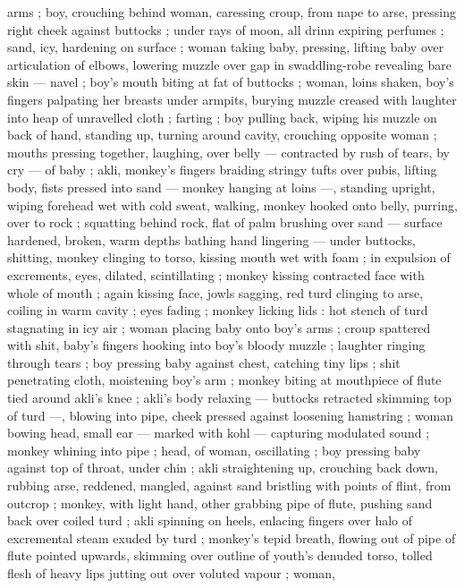 arms ; boy, crouching behind woman, caressing croup, from nape to 
arse, pressing right cheek against buttocks ; under rays of moon, all 
drinn expiring perfumes ; sand, icy, hardening on surface ; woman 
taking baby, pressing, lifting baby over articulation of elbows, 
lowering muzzle over gap in swaddling-robe revealing bare skin --- 
navel ; boy's mouth biting at fat of buttocks ; woman, loins shaken, 
boy's fingers palpating her breasts under armpits, burying muzzle 
creased with laughter into heap of unravelled cloth ; farting ; boy 
pulling back, wiping his muzzle on back of hand, standing up, turning 
around cavity, crouching opposite woman ; mouths pressing together, 
laughing, over belly --- contracted by rush of tears, by cry --- of 
baby ; akli, monkey's fingers braiding stringy tufts over pubis, lifting 
body, fists pressed into sand --- monkey hanging at loins ---, 
standing upright, wiping forehead wet with cold sweat, walking, 
monkey hooked onto belly, purring, over to rock ; squatting behind 
rock, flat of palm brushing over sand --- surface hardened, broken, 
warm depths bathing hand lingering --- under buttocks, shitting, 
monkey clinging to torso, kissing mouth wet with foam ; in expulsion 
of excrements, eyes, dilated, scintillating ; monkey kissing 
contracted face with whole of mouth ; again kissing face, jowls 
sagging, red turd clinging to arse, coiling in warm cavity ; eyes fading 
; monkey licking lids : hot stench of turd stagnating in icy air ; woman 
placing baby onto boy's arms ; croup spattered with shit, baby's 
fingers hooking into boy's bloody muzzle ; laughter ringing through 
tears ; boy pressing baby against chest, catching tiny lips ; shit 
penetrating cloth, moistening boy's arm ; monkey biting at 
mouthpiece of flute tied around akli's knee ; akli's body relaxing --- 
buttocks retracted skimming top of turd ---, blowing into pipe, cheek 
pressed against loosening hamstring ; woman bowing head, small ear 
--- marked with kohl --- capturing modulated sound ; monkey 
whining into pipe ; head, of woman, oscillating ; boy pressing baby 
against top of throat, under chin ; akli straightening up, crouching 
back down, rubbing arse, reddened, mangled, against sand bristling 
with points of flint, from outcrop ; monkey, with light hand, other 
grabbing pipe of flute, pushing sand back over coiled turd ; akli 
spinning on heels, enlacing fingers over halo of excremental steam 
exuded by turd ; monkey's tepid breath, flowing out of pipe of flute 
pointed upwards, skimming over outline of youth's denuded torso, 
tolled flesh of heavy lips jutting out over voluted vapour ; woman, 
